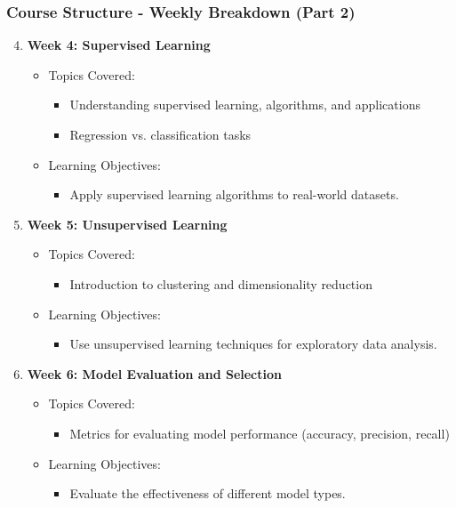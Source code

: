 \documentclass[aspectratio=169]{beamer}
\begin{document}
\begin{frame}[fragile]
  \frametitle{Course Structure - Weekly Breakdown (Part 2)}
  \begin{enumerate}
    \setcounter{enumi}{3} %
    \item \textbf{Week 4: Supervised Learning}
      \begin{itemize}
        \item Topics Covered:
        \begin{itemize}
          \item Understanding supervised learning, algorithms, and applications
          \item Regression vs. classification tasks
        \end{itemize}
        \item Learning Objectives:
        \begin{itemize}
          \item Apply supervised learning algorithms to real-world datasets.
        \end{itemize}
      \end{itemize}
    
    \item \textbf{Week 5: Unsupervised Learning}
      \begin{itemize}
        \item Topics Covered:
        \begin{itemize}
          \item Introduction to clustering and dimensionality reduction
        \end{itemize}
        \item Learning Objectives:
        \begin{itemize}
          \item Use unsupervised learning techniques for exploratory data analysis.
        \end{itemize}
      \end{itemize}
    
    \item \textbf{Week 6: Model Evaluation and Selection}
      \begin{itemize}
        \item Topics Covered:
        \begin{itemize}
          \item Metrics for evaluating model performance (accuracy, precision, recall)
        \end{itemize}
        \item Learning Objectives:
        \begin{itemize}
          \item Evaluate the effectiveness of different model types.
        \end{itemize}
      \end{itemize}
    

\end{enumerate}
\end{frame}
\end{document}
